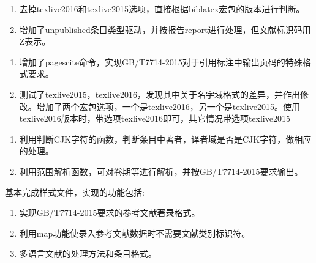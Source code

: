 \begin{enumerate}
\item 去掉texlive2016和texlive2015选项，直接根据biblatex宏包的版本进行判断。

\item 增加了unpublished条目类型驱动，并按报告report进行处理，但文献标识码用Z表示。
\end{enumerate}

\begin{enumerate}
\item 增加了pagescite命令，实现GB/T7714-2015对于引用标注中输出页码的特殊格式要求。

\item 测试了texlive2015，texlive2016，发现其中关于名字域格式的差异，并作出修改。增加了两个宏包选项，一个是texlive2016，另一个是texlive2015。使用texlive2016版本时，带选项texlive2016即可，其它情况带选项texlive2015
\end{enumerate}

\begin{enumerate}
\item 利用判断CJK字符的函数，判断条目中著者，译者域是否是CJK字符，做相应的处理。

\item 利用范围解析函数，可对卷期等进行解析，并按GB/T7714-2015要求输出。
\end{enumerate}

基本完成样式文件，实现的功能包括:
\begin{enumerate}
\item 实现GB/T7714-2015要求的参考文献著录格式。

\item 利用map功能使录入参考文献数据时不需要文献类别标识符。

\item 多语言文献的处理方法和条目格式。
\end{enumerate}
